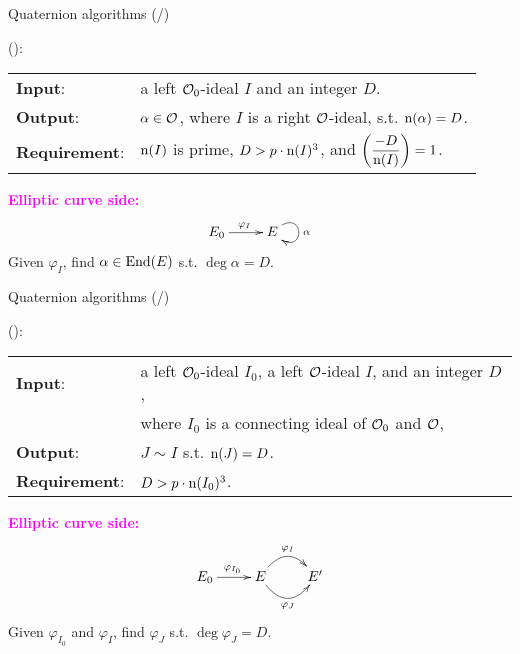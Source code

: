 \begin{frame}{Quaternion algorithms (/\algquatotal{})}

    {\large
    }
    (\cite{EC:DLLW23}):\\[5pt]
    \begin{tabular}{l l}
        \textbf{Input}: & a left $\mathcal{O}_0$-ideal $I$ and an integer $D$.\\[3pt]
        \textbf{Output}: & $\alpha \in \mathcal{O}$, where $I$ is a right $\mathcal{O}$-ideal,
                            s.t. $\mathrm{n}(\alpha) = D$.\\[3pt]
        \textbf{Requirement}: &
                $\mathrm{n}(I)$ is prime,
                $D > p\cdot\mathrm{n}(I)^3$, and $\displaystyle \left(\frac{-D}{\mathrm{n}(I)}\right) = 1$.
    \end{tabular}

    \vspace{15pt}
    \textcolor{magenta}{\textbf{Elliptic curve side:}}
    \begin{align*}
        \xymatrix{
            E_0 \ar[r]^{\varphi_I} & E \ar@(ur,dr)[]^{\alpha}
        }
    \end{align*}
    Given $\varphi_I$,
    find $\alpha \in \mathrm{End}(E)$ s.t. $\deg\alpha = D$.
\end{frame}

\begin{frame}{Quaternion algorithms (/\algquatotal{})}

    {\large
    }
    (\cite{AC:DKLPW20}):\\[5pt]
    \begin{tabular}{l l}
        \textbf{Input}: & a left $\mathcal{O}_0$-ideal $I_0$,
                a left $\mathcal{O}$-ideal $I$, and an integer $D$,\\[2pt]
                & where $I_0$ is a connecting ideal of $\mathcal{O}_0$ and $\mathcal{O}$,\\[3pt]
        \textbf{Output}: & $J \sim I$ s.t. $\mathrm{n}(J) = D$.\\[3pt]
        \textbf{Requirement}: & 
                $D > p\cdot\mathrm{n}(I_0)^3$.
    \end{tabular}

    \vspace{15pt}
    \textcolor{magenta}{\textbf{Elliptic curve side:}}
    \begin{align*}
        \xymatrix{
            E_0 \ar[r]^{\varphi_{I_0}}
                & E \ar@/^15pt/[r]^{\varphi_I} \ar@/_15pt/[r]_{\varphi_J}
                & E'
        }
    \end{align*}
    Given $\varphi_{I_0}$ and $\varphi_I$,
    find $\varphi_J$ s.t. $\deg\varphi_J = D$.
\end{frame}

